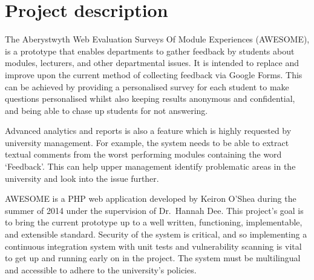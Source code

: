 \documentclass[11pt,fleqn,twoside]{article}
\begin{document}
\wordcount{}

\mmp

\setcounter{tocdepth}{3} %


\section{Project description}

The Aberystwyth Web Evaluation Surveys Of Module Experiences (AWESOME), is a prototype that enables departments to gather feedback by students about modules, lecturers, and other departmental issues.
It is intended to replace and improve upon the current method of collecting feedback via Google Forms.
This can be achieved by providing a personalised survey for each student to make questions personalised whilst also keeping results anonymous and confidential, and being able to chase up students for not answering.

Advanced analytics and reports is also a feature which is highly requested by university management.
For example, the system needs to be able to extract textual comments from the worst performing modules containing the word `Feedback'.
This can help upper management identify problematic areas in the university and look into the issue further.

AWESOME is a PHP web application developed by Keiron O'Shea during the summer of 2014 under the supervision of Dr.~Hannah Dee.
This project's goal is to bring the current prototype up to a well written, functioning, implementable, and extensible standard.
Security of the system is critical, and so implementing a continuous integration system with unit tests and vulnerability scanning is vital to get up and running early on in the project.
The system must be multilingual and accessible to adhere to the university's policies.
\end{document}
